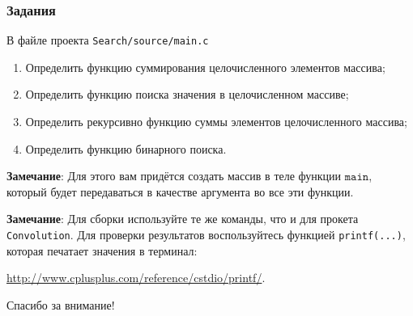 \documentclass{beamer}
\begin{document}
    \begin{frame}[fragile]
        \frametitle{Задания}
        \justifying
        В файле проекта {\tt Search/source/main.c}
        \begin{enumerate}
            \item Определить функцию суммирования целочисленного элементов массива;
            \item Определить функцию поиска значения в целочисленном массиве;
            \item Определить рекурсивно функцию суммы элементов целочисленного массива;
            \item Определить функцию бинарного поиска.
        \end{enumerate}
        \par
        \justifying
        {\bf Замечание}: Для этого вам придётся создать массив в теле функции $\texttt{main}$, который будет
        передаваться в качестве аргумента во все эти функции.
        \par
        {\bf Замечание}: Для сборки используйте те же команды, что и для прокета {\tt Convolution}. Для проверки результатов воспользуйтесь функцией {\tt printf(...)}, которая печатает значения в терминал: \par
        \url{http://www.cplusplus.com/reference/cstdio/printf/}.
    \end{frame}
    \begin{frame}
        \begin{center}
        \baselineskip 20.0mm
        \Huge Спасибо за внимание!
        \end{center}
    \end{frame}
\end{document}
